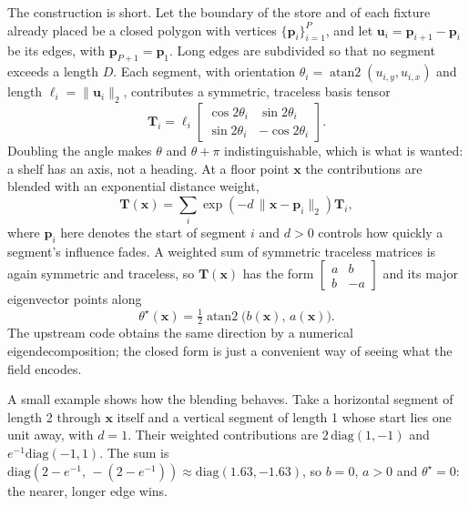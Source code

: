 The construction is short. Let the boundary of the store and of each fixture already placed be a closed polygon with vertices $\{\mathbf{p}_i\}_{i=1}^{P}$, and let $\mathbf{u}_i = \mathbf{p}_{i+1}-\mathbf{p}_i$ be its edges, with $\mathbf{p}_{P+1}=\mathbf{p}_1$. Long edges are subdivided so that no segment exceeds a length $D$. Each segment, with orientation $\theta_i=\operatorname{atan2}(u_{i,y},u_{i,x})$ and length $\ell_i=\lVert\mathbf{u}_i\rVert_2$, contributes a symmetric, traceless basis tensor
\begin{equation}
  \mathbf{T}_i = \ell_i
  \begin{bmatrix}
  \cos 2\theta_i & \sin 2\theta_i\\
  \sin 2\theta_i & -\cos 2\theta_i
  \end{bmatrix}.
  \label{eq:basis-tensor}
\end{equation}
Doubling the angle makes $\theta$ and $\theta+\pi$ indistinguishable, which is what is wanted: a shelf has an axis, not a heading. At a floor point $\mathbf{x}$ the contributions are blended with an exponential distance weight,
\begin{equation}
  \mathbf{T}(\mathbf{x}) = \sum_i
  \exp\!\left(-d\,\lVert\mathbf{x}-\mathbf{p}_i\rVert_2\right)\mathbf{T}_i ,
  \label{eq:tensor-field}
\end{equation}
where $\mathbf{p}_i$ here denotes the start of segment $i$ and $d>0$ controls how quickly a segment's influence fades. A weighted sum of symmetric traceless matrices is again symmetric and traceless, so $\mathbf{T}(\mathbf{x})$ has the form $\left[\begin{smallmatrix} a & b\\ b & -a\end{smallmatrix}\right]$ and its major eigenvector points along
\begin{equation}
  \theta^{\star}(\mathbf{x}) = \tfrac{1}{2}\operatorname{atan2}\!\big(b(\mathbf{x}),\,a(\mathbf{x})\big).
  \label{eq:tensor-orientation}
\end{equation}
The upstream code obtains the same direction by a numerical eigendecomposition; the closed form is just a convenient way of seeing what the field encodes.

A small example shows how the blending behaves. Take a horizontal segment of length 2 through $\mathbf{x}$ itself and a vertical segment of length 1 whose start lies one unit away, with $d=1$. Their weighted contributions are $2\,\mathrm{diag}(1,-1)$ and $e^{-1}\mathrm{diag}(-1,1)$. The sum is $\mathrm{diag}(2-e^{-1},\,-(2-e^{-1})) \approx \mathrm{diag}(1.63,-1.63)$, so $b=0$, $a>0$ and $\theta^\star=0$: the nearer, longer edge wins.

